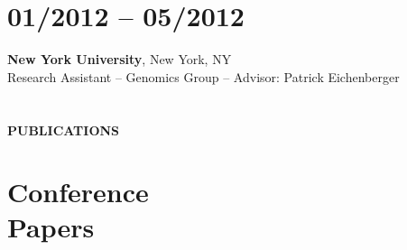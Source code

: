 \section{01/2012 -- 05/2012}
\textbf{New York University}, New York, NY \\
Research Assistant --  Genomics Group -- Advisor: Patrick Eichenberger

%
%
%
\section{} \vspace{0.2in} \textbf{PUBLICATIONS} \vspace{-0.05in}


\section{Conference \\ Papers}

